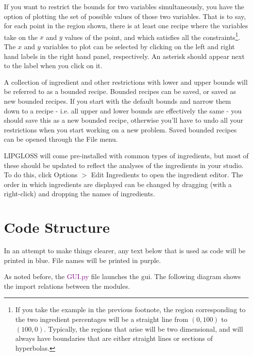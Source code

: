 \documentclass[a4paper,10pt]{article}
\def\green{\textcolor{Purple}}
\begin{document}
If you want to restrict the bounds for two variables simultaneously, you have the option of plotting the set of possible values of those two variables. That is to say, for each point in the region shown, there is at least one recipe where the variables take on the $x$ and $y$ values of the point, and which satisfies all the constraints\footnote{If you take the example in the previous footnote, the region corresponding to the two ingredient percentages will be a straight line from $(0,100)$ to $(100,0)$. Typically, the regions that arise will be two dimensional, and will always have boundaries that are either straight lines or sections of hyperbolas.}. The $x$ and $y$ variables to plot can be selected by clicking on the left and right hand labels in the right hand panel, respectively. An asterisk should appear next to the label when you click on it. %

A collection of ingredient and other restrictions with lower and upper bounds will be referred to as a bounded recipe. Bounded recipes can be saved, or saved as new bounded recipes. If you start with the default bounds and narrow them down to a recipe - i.e. all upper and lower bounds are effectively the same - you should save this as a new bounded recipe, otherwise you'll have to undo all your restrictions when you start working on a new problem. Saved bounded recipes can be opened through the File menu.

LIPGLOSS will come pre-installed with common types of ingredients, but most of these should be updated to reflect the analyses of the ingredients in your studio. To do this, click Options $>$ Edit Ingredients to open the ingredient editor. The order in which ingredients are displayed can be changed by dragging (with a right-click) and dropping the names of ingredients.

\section{Code Structure}
In an attempt to make things clearer, any text below that is used as code will be printed in blue. File names will be printed in purple.

As noted before, the \green{GUI.py} file launches the gui. The following diagram shows the import relations between the modules.
\end{document}
